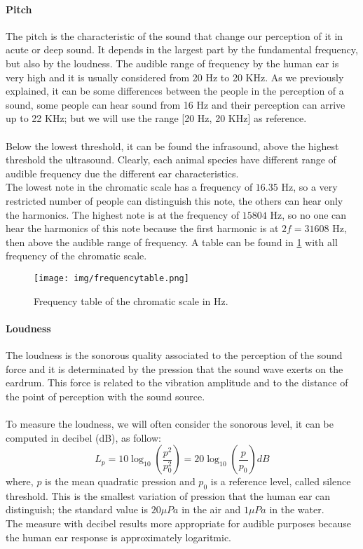 \paragraph{Pitch}
The pitch is the characteristic of the sound that change our perception of it in acute or deep sound. It depends in the largest part by the fundamental frequency, but also by the loudness. The audible range of frequency by the human ear is very high and it is usually considered from 20 Hz to 20 KHz. As we previously explained, it can be some differences between the people in the perception of a sound, some people can hear sound from 16 Hz and their perception can arrive up to 22 KHz; but we will use the range [20 Hz, 20 KHz] as reference.\\\\
Below the lowest threshold, it can be found the infrasound, above the highest threshold the ultrasound. Clearly, each animal species have different range of audible frequency due the different ear characteristics.\\
The lowest note in the chromatic scale has a frequency of $16.35$ Hz, so a very restricted number of people can distinguish this note, the others can hear only the harmonics. The highest note is at the frequency of $15804$ Hz, so no one can hear the harmonics of this note because the first harmonic is at $2f=31608$ Hz, then above the audible range of frequency.  A table can be found in \ref{fig:frequencytable} with all frequency of the chromatic scale. 
\begin{figure}[h]\centering
\texttt{[image: img/frequencytable.png]} 
\caption{Frequency table of the chromatic scale in Hz.} \label{fig:frequencytable}
\end{figure}

\paragraph{Loudness}
The loudness is the sonorous quality associated to the perception of the sound force and it is determinated by the pression that the sound wave exerts on the eardrum. This force is related to the vibration amplitude and to the distance of the point of perception with the sound source.\\\\
To measure the loudness, we will often consider the sonorous level, it can be computed in decibel (dB), as follow:
\[ L_p = 10\log_{10}(\frac{p^2}{p_0^2}) = 20\log_{10}(\frac{p}{p_0}) dB\]
where, $p$ is the mean quadratic pression and $p_0$ is a reference level, called silence threshold. This is the smallest variation of pression that the human ear can distinguish; the standard value is $20\mu Pa$  in the air and $1 \mu Pa$  in the water.\\
The measure with decibel results more appropriate for audible purposes because the human ear response is approximately logaritmic.

